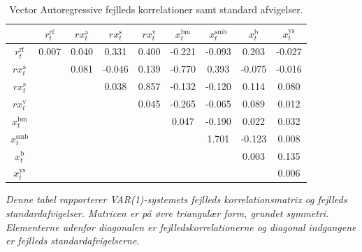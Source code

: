 \documentclass[
  a4paper,
  oneside]{memoir}
\begin{document}
\begin{table}[H]

\caption{\label{tab:COV-RES-TAB}Vector Autoregressive fejlleds korrelationer samt standard afvigelser.}
\centering
\begin{threeparttable}
\begin{tabular}[t]{ccccccccc}
\toprule
  & $r_t^{\text{rf}}$ & $rx_t^{\text{a}}$ & $rx_t^{\text{s}}$ & $rx_t^{\text{v}}$ & $x_t^{\text{bm}}$ & $x_t^{\text{smb}}$ & $x_t^{\text{b}}$ & $x_t^{\text{ys}}$\\
\midrule
\rowcolor{gray!6}  $r_t^{\text{rf}}$ & 0.007 & 0.040 & 0.331 & 0.400 & -0.221 & -0.093 & 0.203 & -0.027\\
 
$rx_t^{\text{a}}$ &  & 0.081 & -0.046 & 0.139 & -0.770 & 0.393 & -0.075 & -0.016\\
 
\rowcolor{gray!6}  $rx_t^{\text{s}}$ &  &  & 0.038 & 0.857 & -0.132 & -0.120 & 0.114 & 0.080\\
 
$rx_t^{\text{v}}$ &  &  &  & 0.045 & -0.265 & -0.065 & 0.089 & 0.012\\
 
\rowcolor{gray!6}  $x_t^{\text{bm}}$ &  &  &  &  & 0.047 & -0.190 & 0.022 & 0.032\\
 
$x_t^{\text{smb}}$ &  &  &  &  &  & 1.701 & -0.123 & 0.008\\
 
\rowcolor{gray!6}  $x_t^{\text{b}}$ &  &  &  &  &  &  & 0.003 & 0.135\\
 
$x_t^{\text{ys}}$ &  &  &  &  &  &  &  & 0.006\\
\bottomrule
\end{tabular}
\begin{tablenotes}
\item \textit{Denne tabel rapporterer VAR(1)-systemets fejlleds korrelationsmatrix og fejlleds standardafvigelser. Matricen er på øvre triangulær form, grundet symmetri. Elementerne udenfor diagonalen er fejlledskorrelationerne og diagonal indgangene er fejlleds standardafvigelserne.}
\end{tablenotes}
\end{threeparttable}
\end{table}
\end{document}
